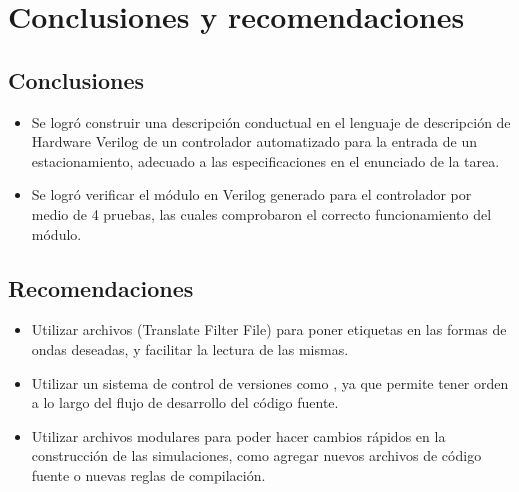 \section{Conclusiones y recomendaciones}
\subsection{Conclusiones}
\begin{itemize}
    \item Se logró construir una descripción conductual en el lenguaje de descripción de Hardware Verilog de un controlador automatizado para la entrada de un estacionamiento, adecuado a las especificaciones en el enunciado de la tarea.
    \item Se logró verificar el módulo en Verilog generado para el controlador por medio de 4 pruebas, las cuales comprobaron el correcto funcionamiento del módulo. 
\end{itemize}
\subsection{Recomendaciones}
\begin{itemize}
    \item Utilizar archivos  (Translate Filter File) para poner etiquetas en las formas de ondas deseadas, y facilitar la lectura de las mismas. 
    \item Utilizar un sistema de control de versiones como , ya que permite tener orden a lo largo del flujo de desarrollo del código fuente. 
    \item Utilizar archivos  modulares para poder hacer cambios rápidos en la construcción de las simulaciones, como agregar nuevos archivos de código fuente o nuevas reglas de compilación.
\end{itemize}
